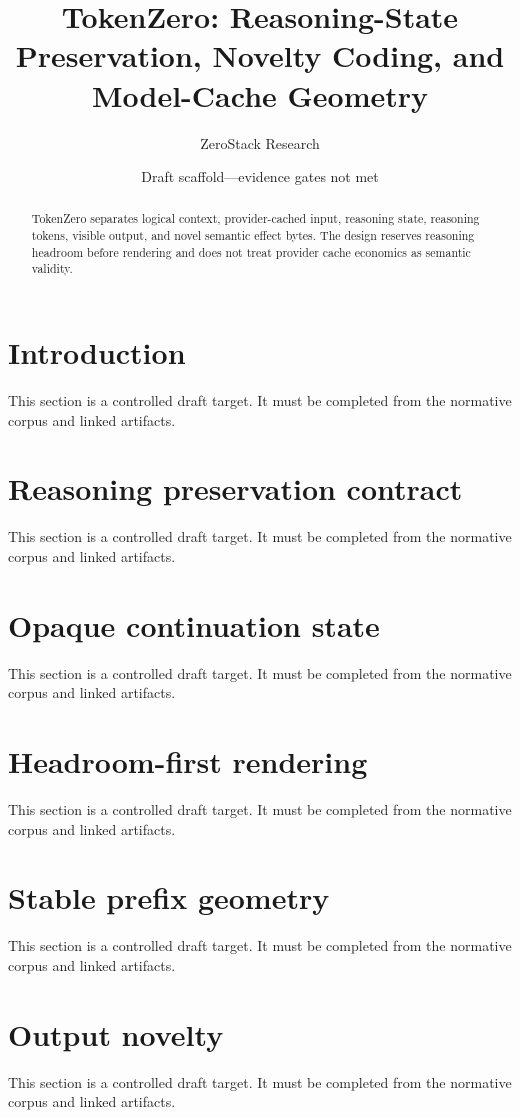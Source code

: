 \documentclass[11pt]{article}
\title{TokenZero: Reasoning-State Preservation, Novelty Coding, and Model-Cache Geometry}
\author{ZeroStack Research}
\date{Draft scaffold---evidence gates not met}
\begin{document}
\maketitle
\begin{abstract}
TokenZero separates logical context, provider-cached input, reasoning state, reasoning tokens, visible output, and novel semantic effect bytes. The design reserves reasoning headroom before rendering and does not treat provider cache economics as semantic validity.
\end{abstract}
\tableofcontents
\section{Introduction}
This section is a controlled draft target. It must be completed from the normative corpus and linked artifacts.

\section{Reasoning preservation contract}
This section is a controlled draft target. It must be completed from the normative corpus and linked artifacts.

\section{Opaque continuation state}
This section is a controlled draft target. It must be completed from the normative corpus and linked artifacts.

\section{Headroom-first rendering}
This section is a controlled draft target. It must be completed from the normative corpus and linked artifacts.

\section{Stable prefix geometry}
This section is a controlled draft target. It must be completed from the normative corpus and linked artifacts.

\section{Output novelty}
This section is a controlled draft target. It must be completed from the normative corpus and linked artifacts.
\end{document}
